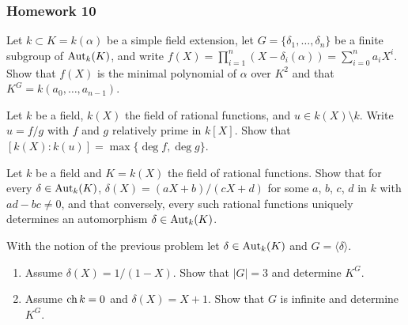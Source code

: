 \subsubsection{Homework 10}
\setcounter{exercise}{0}
\setcounter{equation}{0}

\begin{problem}
  Let \(k\subset K=k(\alpha)\) be a simple field extension, let
  \(G=\{\delta_1,\dotsc,\delta_n\}\) be a finite subgroup of \(\operatorname{Aut}_k(K)\),
  and write
  \(f(X)=\prod_{i=1}^n(X-\delta_i(\alpha))=\sum_{i=0}^na_iX^i\). Show that
  \(f(X)\) is the minimal polynomial of \(\alpha\) over \(K^2\) and that
  \(K^G=k(a_0,\dotsc,a_{n-1})\).
\end{problem}
\begin{solution}
\end{solution}

\begin{problem}
  Let \(k\) be a field, \(k(X)\) the field of rational functions, and
  \(u\in k(X)\setminus k\). Write \(u= f/g\) with \(f\) and \(g\)
  relatively prime in \(k[X]\). Show that
  \([k(X):k(u)]=\max\{{\deg f},{\deg g}\}\).
\end{problem}
\begin{solution}
\end{solution}

\begin{problem}
  Let \(k\) be a field and \(K= k(X)\) the field of rational
  functions. Show that for every \(\delta\in\operatorname{Aut}_k(K)\),
  \(\delta(X)= (aX+b)/(cX+d)\) for some \(a\), \(b\), \(c\), \(d\) in \(k\)
  with \(ad-bc\neq 0\), and that conversely, every such rational functions
  uniquely determines an automorphism \(\delta\in\operatorname{Aut}_k(K)\).
\end{problem}
\begin{solution}
\end{solution}

\begin{problem}
  With the notion of the previous problem let \(\delta\in\operatorname{Aut}_k(K)\) and
  \(G=\langle \delta \rangle\).
  \begin{enumerate}[label=(\alph*),noitemsep]
  \item Assume \(\delta(X)=1/(1-X)\). Show that \(|G|=3\) and determine
    \(K^G\).
  \item Assume \(\operatorname{ch} k=0\) and \(\delta(X)=X+1\). Show that \(G\) is
    infinite and determine \(K^G\).
  \end{enumerate}
\end{problem}
\begin{solution}
\end{solution}


